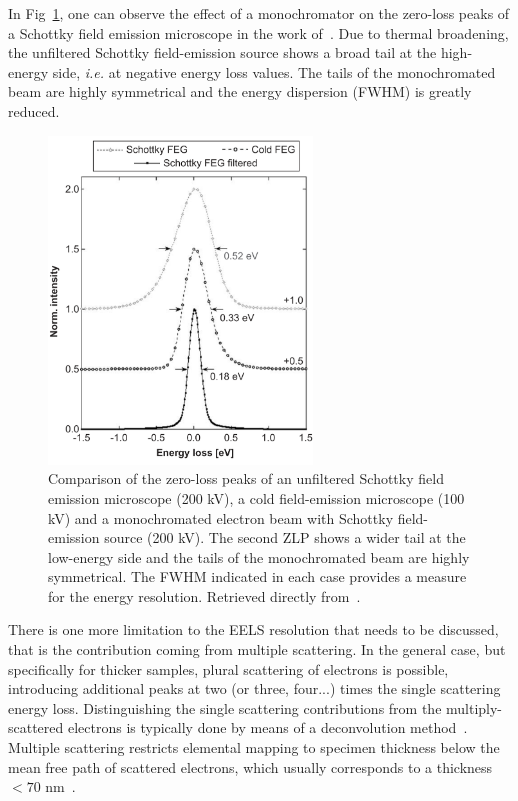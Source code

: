 In Fig~\ref{fig:monochromation}, one can observe the effect of a monochromator 
on the zero-loss peaks of a Schottky field emission microscope in the work of~\cite{Erni:2005}. 
%
Due to thermal broadening, the unfiltered Schottky field-emission source
shows a broad tail at the high-energy side, {\it i.e.} at negative energy loss values.
%
The tails of the monochromated beam are highly symmetrical and the energy dispersion (FWHM)
is greatly reduced.

\begin{figure}[H]
    \centering
    \includegraphics[width=70mm]{plots/monochromator.png}
    \caption{Comparison of the zero-loss peaks of an unfiltered Schottky field emission microscope 
    (200 kV), a cold field-emission microscope (100 kV) and a monochromated electron beam with 
    Schottky field-emission source (200 kV). 
    The second ZLP shows a wider tail at the low-energy side and the tails of the 
    monochromated beam are highly symmetrical. 
    The FWHM indicated in each case provides a measure for the energy resolution.
    Retrieved directly from~\cite{Erni:2005}.}
    \label{fig:monochromation}
\end{figure}

There is one more limitation to the EELS resolution that needs to be discussed,
that is the contribution coming from multiple scattering. 
%
In the general case, but specifically for thicker samples, plural scattering of electrons
is possible, introducing additional peaks at two (or three, four...) times the single
scattering energy loss. 
%
Distinguishing the single scattering contributions from the multiply-scattered electrons 
is typically done by means of a deconvolution method~\cite{Egerton:1996}.
%
Multiple scattering restricts elemental mapping to specimen thickness below the mean free path of scattered 
electrons, which usually corresponds to a thickness $<70$ nm~\cite{Hofer:2016}.


